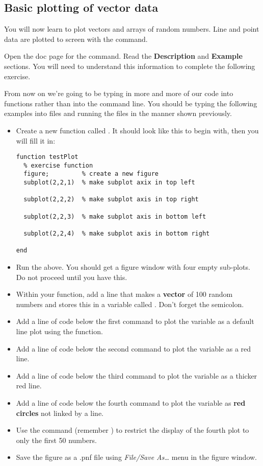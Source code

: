 \documentclass{article}
\begin{document}
\subsection*{Basic plotting of vector data}

You will now learn to plot vectors and arrays of random numbers.
Line and point data are plotted to screen with the  command.

Open the doc page for the  command.
Read the \textbf{Description} and \textbf{Example} sections.
You will need to understand this information to complete the following exercise.

From now on we're going to be typing in more and more of our code into functions rather than into the command line.
You should be typing the following examples into files and running the files in the manner shown previously.


\begin{itemize}
\item Create a new function called . It should look like this to begin with, then you will fill it in:
\begin{lstlisting}
function testPlot
  % exercise function
  figure;         % create a new figure
  subplot(2,2,1)  % make subplot axix in top left

  subplot(2,2,2)  % make subplot axis in top right

  subplot(2,2,3)  % make subplot axis in bottom left

  subplot(2,2,4)  % make subplot axis in bottom right

end
\end{lstlisting}

\item Run the above. You should get a figure window with four empty sub-plots.
  Do not proceed until you have this.
\item Within your function, add a line that makes a \textbf{vector} of 100 random numbers and stores this in a variable called .
  Don't forget the semicolon.
\item Add a line of code below the first  command to plot the variable  as a default line plot using the  function.
\item Add a line of code below the second  command to plot the variable  as a red line.
\item Add a line of code below the third  command to plot the variable  as a thicker red line.
\item Add a line of code below the fourth  command to plot the variable  as \textbf{red circles} not linked by a line.
\item Use the  command (remember ) to restrict the display of the fourth plot to only the first 50 numbers.
\item Save the figure as a .pnf file using \emph{File/Save As\dots} menu in the figure window.
\end{itemize}
\end{document}
